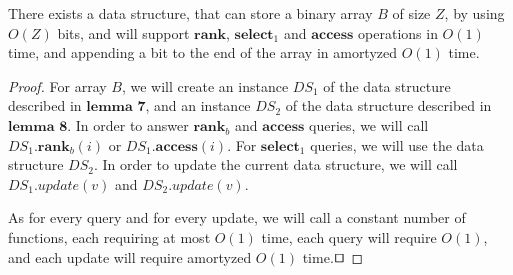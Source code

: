 \documentclass[runningheads]{llncs}
\begin{document}
\begin{theorem}
    There exists a data structure, that can store a binary array $B$ of size $Z$, by using $O(Z)$ bits, and will support $\textbf{rank}$, $\textbf{select}_1$ and $\textbf{access}$ operations in $O(1)$ time,
    and appending a bit to the end of the array in amortyzed $O(1)$ time.
\end{theorem}
\begin{proof}
    For array $B$, we will create an instance $DS_1$ of the data structure described in $\textbf{lemma 7}$, 
    and an instance $DS_2$ of the data structure described in $\textbf{lemma 8}$.
    In order to answer $\textbf{rank}_b$ and $\textbf{access}$ queries, we will call $DS_1.\textbf{rank}_b(i)$ or $DS_1.\textbf{access}(i)$.
    For $\textbf{select}_1$ queries, we will use the data structure $DS_2$.
    In order to update the current data structure, we will call $DS_1.update(v)$ and $DS_2.update(v)$.

    As for every query and for every update, we will call a constant number of functions, each requiring at most $O(1)$ time, each query will require $O(1)$, and each update will require amortyzed $O(1)$ time.$\qed$
\end{proof}
%
%
%
% 
% 
%



\end{document}
